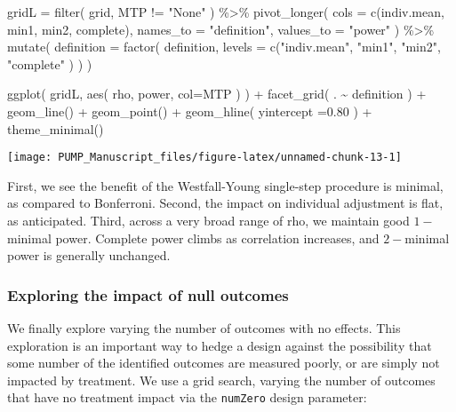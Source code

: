 \documentclass[
]{article}
\newenvironment{Shaded}{\begin{snugshade}}{\end{snugshade}}
\newcommand{\AttributeTok}[1]{\textcolor[rgb]{0.77,0.63,0.00}{#1}}
\newcommand{\FloatTok}[1]{\textcolor[rgb]{0.00,0.00,0.81}{#1}}
\newcommand{\FunctionTok}[1]{\textcolor[rgb]{0.00,0.00,0.00}{#1}}
\newcommand{\NormalTok}[1]{#1}
\newcommand{\OtherTok}[1]{\textcolor[rgb]{0.56,0.35,0.01}{#1}}
\newcommand{\SpecialCharTok}[1]{\textcolor[rgb]{0.00,0.00,0.00}{#1}}
\newcommand{\StringTok}[1]{\textcolor[rgb]{0.31,0.60,0.02}{#1}}
\begin{document}
\begin{Shaded}
\begin{Highlighting}[]
\NormalTok{gridL }\OtherTok{=} \FunctionTok{filter}\NormalTok{( grid, MTP }\SpecialCharTok{!=} \StringTok{"None"}\NormalTok{ ) }\SpecialCharTok{\%\textgreater{}\%}
  \FunctionTok{pivot\_longer}\NormalTok{( }\AttributeTok{cols =} \FunctionTok{c}\NormalTok{(indiv.mean, min1, min2, complete),}
                \AttributeTok{names\_to =} \StringTok{"definition"}\NormalTok{, }\AttributeTok{values\_to =} \StringTok{"power"}\NormalTok{ ) }\SpecialCharTok{\%\textgreater{}\%}
  \FunctionTok{mutate}\NormalTok{( }\AttributeTok{definition =} \FunctionTok{factor}\NormalTok{( definition,}
                            \AttributeTok{levels =} \FunctionTok{c}\NormalTok{(}\StringTok{"indiv.mean"}\NormalTok{, }\StringTok{"min1"}\NormalTok{, }\StringTok{"min2"}\NormalTok{, }\StringTok{"complete"}\NormalTok{ ) ) )}

\FunctionTok{ggplot}\NormalTok{( gridL, }\FunctionTok{aes}\NormalTok{( rho, power, }\AttributeTok{col=}\NormalTok{MTP ) ) }\SpecialCharTok{+}
  \FunctionTok{facet\_grid}\NormalTok{( . }\SpecialCharTok{\textasciitilde{}}\NormalTok{ definition ) }\SpecialCharTok{+}
  \FunctionTok{geom\_line}\NormalTok{() }\SpecialCharTok{+} \FunctionTok{geom\_point}\NormalTok{() }\SpecialCharTok{+}
  \FunctionTok{geom\_hline}\NormalTok{( }\AttributeTok{yintercept =}\FloatTok{0.80}\NormalTok{ ) }\SpecialCharTok{+} \FunctionTok{theme\_minimal}\NormalTok{()}
\end{Highlighting}
\end{Shaded}

\begin{center}\texttt{[image: PUMP\_Manuscript\_files/figure-latex/unnamed-chunk-13-1]} \end{center}

First, we see the benefit of the Westfall-Young single-step procedure is
minimal, as compared to Bonferroni. Second, the impact on individual
adjustment is flat, as anticipated. Third, across a very broad range of
rho, we maintain good \(1-\)minimal power. Complete power climbs as
correlation increases, and \(2-\)minimal power is generally unchanged.

\subsubsection{Exploring the impact of null outcomes}

We finally explore varying the number of outcomes with no effects. This
exploration is an important way to hedge a design against the
possibility that some number of the identified outcomes are measured
poorly, or are simply not impacted by treatment. We use a grid search,
varying the number of outcomes that have no treatment impact via the
\texttt{numZero} design parameter:
\end{document}
